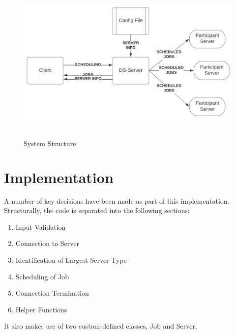 \documentclass[a4paper]{article} %
\begin{document}
\begin{figure}[h]
    \centering
    \includegraphics[height=8cm]{System Structure.png}
    \caption{System Structure}
\end{figure}

\pagebreak
\section{Implementation} %
A number of key decisions have been made as part of this implementation. Structurally, the code is separated into the following sections:
\begin{enumerate}
    \item Input Validation
    \item Connection to Server
    \item Identification of Largest Server Type
    \item Scheduling of Job
    \item Connection Termination
    \item Helper Functions
\end{enumerate}
It also makes use of two custom-defined classes, Job and Server. 
\end{document}
